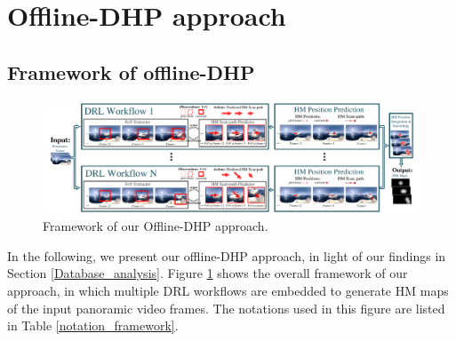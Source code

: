 \documentclass[10pt,journal,compsoc]{IEEEtran}
\begin{document}



\section{Offline-DHP approach}

\subsection{Framework of offline-DHP}
\label{framework}

\begin{figure}
	\begin{center}
		\centerline{\includegraphics[width=2\columnwidth]{figures/dhp_approach/main_framework}}%
		\caption{Framework of our Offline-DHP approach.}
		\label{main-framework}
	\end{center}
\end{figure}

In the following, we present our offline-DHP approach, in light of our findings in Section \ref{Database_analysis}.
Figure \ref{main-framework} shows the overall framework of our approach, in which multiple DRL workflows are embedded to generate HM maps of the input panoramic video frames. The notations used in this figure are listed in Table \ref{notation_framework}.
\end{document}
